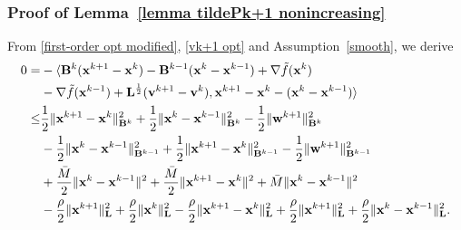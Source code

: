 \documentclass[12pt,draftcls,onecolumn]{IEEEtran}
\begin{document}
\subsubsection{Proof of Lemma~\ref{lemma tildePk+1 nonincreasing}}\label{proof lemma tildePk+1 nonincreasing}
From \eqref{first-order opt modified}, \eqref{vk+1 opt} and Assumption~\ref{smooth}, we derive
\vspace{-0.2cm}
\begin{align}
	0=& -\langle \mathbf{B}^k (\mathbf{x}^{k+1}-\mathbf{x}^k)-\mathbf{B}^{k-1}(\mathbf{x}^{k}-\mathbf{x}^{k-1})+\nabla \tilde{f}(\mathbf{x}^k) \notag\\
    &-\nabla \tilde{f}(\mathbf{x}^{k-1}) + \mathbf{L}^{\frac{1}{2}}(\mathbf{v}^{k+1}-\mathbf{v}^k), \mathbf{x}^{k+1}-\mathbf{x}^k-(\mathbf{x}^{k}-\mathbf{x}^{k-1})\rangle\notag\\
	\leq & \frac{1}{2}\|\mathbf{x}^{k+1} - \mathbf{x}^{k}\|^2_{\mathbf{B}^k}+\frac{1}{2}\|\mathbf{x}^{k} - \mathbf{x}^{k-1}\|^2_{\mathbf{B}^k}-\frac{1}{2}\|\mathbf{w}^{k+1}\|^2_{\mathbf{B}^k}\notag\\
    & - \frac{1}{2}\|\mathbf{x}^{k} - \mathbf{x}^{k-1}\|^2_{\mathbf{B}^{k-1}}+\frac{1}{2}\|\mathbf{x}^{k+1} - \mathbf{x}^{k}\|^2_{\mathbf{B}^{k-1}}-\frac{1}{2}\|\mathbf{w}^{k+1}\|^2_{\mathbf{B}^{k-1}}\notag\\
	& + \frac{\bar{M}}{2}\|\mathbf{x}^{k} - \mathbf{x}^{k-1}\|^2+\frac{\bar{M}}{2}\|\mathbf{x}^{k+1} - \mathbf{x}^{k}\|^2+\bar{M}\|\mathbf{x}^{k} - \mathbf{x}^{k-1}\|^2\notag\\
	& -\frac{\rho}{2}\|\mathbf{x}^{k+1}\|^2_\mathbf{L} + \frac{\rho}{2}\|\mathbf{x}^k\|^2_\mathbf{L}- \frac{\rho}{2}\|\mathbf{x}^{k+1}- \mathbf{x}^{k}\|^2_\mathbf{L}+\frac{\rho}{2}\|\mathbf{x}^{k+1}\|^2_\mathbf{L} + \frac{\rho}{2}\|\mathbf{x}^{k}- \mathbf{x}^{k-1}\|^2_\mathbf{L}. \label{0=-<>}

\end{align}
\end{document}
